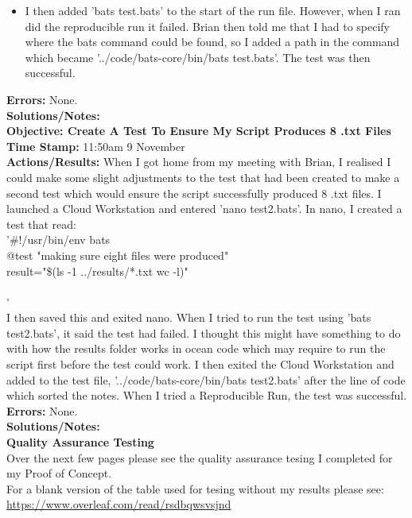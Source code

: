 \documentclass{article}
\begin{document}
\begin{FlushLeft}
\begin{itemize}
  \item I then added 'bats test.bats' to the start of the run file. However, when I ran did the reproducible run it failed. Brian then told me that I had to specify where the bats command could be found, so I added a path in the command which became '../code/bats-core/bin/bats test.bats'. The test was then successful.
\end{itemize}
\textbf{Errors:} None.\\
\textbf{Solutions/Notes:} \\
\vspace{5mm}
\textbf{Objective: Create A Test To Ensure My Script Produces 8 .txt Files}\\ 
\textbf{Time Stamp:} 11:50am 9 November\\
\textbf{Actions/Results:} When I got home from my meeting with Brian, I realised I could make some slight adjustments to the test that had been created to make a second test which would ensure the script successfully produced 8 .txt files. I launched a Cloud Workstation and entered 'nano test2.bats'. In nano, I created a test that read:\\
'#!/usr/bin/env bats\\
@test "making sure eight files were produced" {\\
  result="\$(ls -1 ../results/*.txt \textbar{} wc -l)"\\
  [ "\$result" -eq 8 ]\\
}'\\
I then saved this and exited nano. When I tried to run the test using 'bats test2.bats', it said the test had failed. I thought this might have something to do with how the results folder works in ocean code which may require to run the script first before the test could work. I then exited the Cloud Workstation and added to the test file, '../code/bats-core/bin/bats test2.bats' after the line of code which sorted the notes. When I tried a Reproducible Run, the test was successful.\\
\textbf{Errors:} None.\\
\textbf{Solutions/Notes:} \\
\vspace{20mm}
\textbf{Quality Assurance Testing}\\
\vspace{5mm}
Over the next few pages please see the quality assurance tesing I completed for my Proof of Concept.\\
\vspace{5mm}
For a blank version of the table used for tesing without my results please see:\\
\url{https://www.overleaf.com/read/rsdbqwsvsjnd}


\end{FlushLeft}
\end{document}

